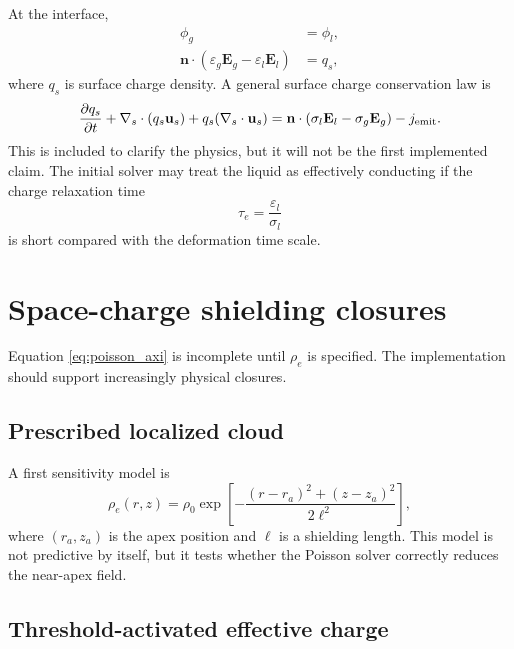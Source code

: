 \documentclass[11pt]{article}
\newcommand{\eps}{\varepsilon}
\newcommand{\vE}{\mathbf{E}}
\newcommand{\vU}{\mathbf{u}}
\newcommand{\vn}{\mathbf{n}}
\begin{document}
At the interface,
\begin{align}
    \phi_g&=\phi_l,\\
    \vn\cdot(\eps_g\vE_g-\eps_l\vE_l)&=q_s,
\end{align}
where \(q_s\) is surface charge density. A general surface charge conservation law is
\begin{equation}
    \frac{\partial q_s}{\partial t}
    +\nabla_s\cdot(q_s\vU_s)
    +q_s(\nabla_s\cdot\vU_s)
    =
    \vn\cdot(\sigma_l\vE_l-\sigma_g\vE_g)-j_{\rm emit}.
    \label{eq:surface_charge}
\end{equation}
This is included to clarify the physics, but it will not be the first implemented claim. The initial solver may treat the liquid as effectively conducting if the charge relaxation time
\begin{equation}
    \tau_e=\frac{\eps_l}{\sigma_l}
\end{equation}
is short compared with the deformation time scale.

\section{Space-charge shielding closures}

Equation \eqref{eq:poisson_axi} is incomplete until \(\rho_e\) is specified. The implementation should support increasingly physical closures.

\subsection{Prescribed localized cloud}

A first sensitivity model is
\begin{equation}
    \rho_e(r,z)=\rho_0\exp\left[-\frac{(r-r_a)^2+(z-z_a)^2}{2\ell^2}\right],
    \label{eq:gaussian_rho}
\end{equation}
where \((r_a,z_a)\) is the apex position and \(\ell\) is a shielding length. This model is not predictive by itself, but it tests whether the Poisson solver correctly reduces the near-apex field.

\subsection{Threshold-activated effective charge}
\end{document}
